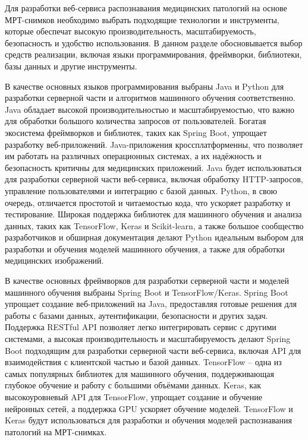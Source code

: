 {\gostFont

  \par \redline Для разработки веб-сервиса распознавания медицинских патологий на основе МРТ-снимков необходимо выбрать подходящие технологии и инструменты, которые обеспечат высокую производительность, масштабируемость, безопасность и удобство использования. В данном разделе обосновывается выбор средств реализации, включая языки программирования, фреймворки, библиотеки, базы данных и другие инструменты.
  
  \par \redline В качестве основных языков программирования выбраны Java и Python для разработки серверной части и алгоритмов машинного обучения соответственно. Java обладает высокой производительностью и масштабируемостью, что важно для обработки большого количества запросов от пользователей. Богатая экосистема фреймворков и библиотек, таких как Spring Boot, упрощает разработку веб-приложений. Java-приложения кроссплатформенны, что позволяет им работать на различных операционных системах, а их надёжность и безопасность критичны для медицинских приложений. Java будет использоваться для разработки серверной части веб-сервиса, включая обработку HTTP-запросов, управление пользователями и интеграцию с базой данных. Python, в свою очередь, отличается простотой и читаемостью кода, что ускоряет разработку и тестирование. Широкая поддержка библиотек для машинного обучения и анализа данных, таких как TensorFlow, Keras и Scikit-learn, а также большое сообщество разработчиков и обширная документация делают Python идеальным выбором для разработки и обучения моделей машинного обучения, а также для обработки медицинских изображений.

  \par \redline В качестве основных фреймворков для разработки серверной части и моделей машинного обучения выбраны Spring Boot и TensorFlow/Keras. Spring Boot упрощает создание веб-приложений на Java, предоставляя готовые решения для работы с базами данных, аутентификации, безопасности и других задач. Поддержка RESTful API позволяет легко интегрировать сервис с другими системами, а высокая производительность и масштабируемость делают Spring Boot подходящим для разработки серверной части веб-сервиса, включая API для взаимодействия с клиентской частью и базой данных. TensorFlow – одна из самых популярных библиотек для машинного обучения, поддерживающая глубокое обучение и работу с большими объёмами данных. Keras, как высокоуровневый API для TensorFlow, упрощает создание и обучение нейронных сетей, а поддержка GPU ускоряет обучение моделей. TensorFlow и Keras будут использоваться для разработки и обучения моделей распознавания патологий на МРТ-снимках.

}
